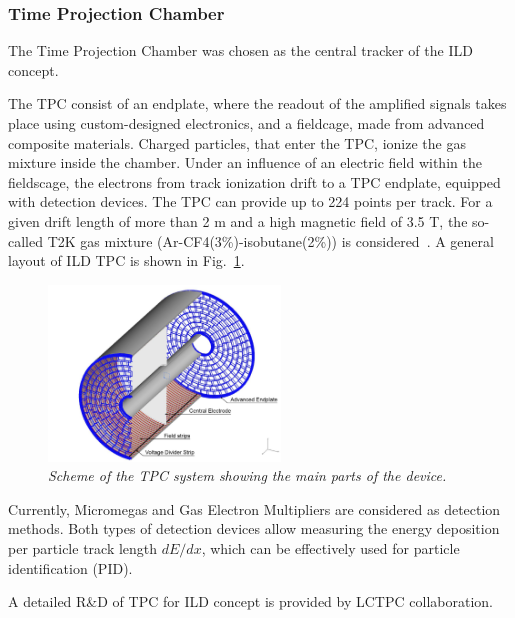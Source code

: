 \subsubsection{Time Projection Chamber}

The Time Projection Chamber was chosen as the central tracker of the ILD concept. %

The TPC consist of an endplate, where the readout of the amplified signals takes place using custom-designed electronics, and a fieldcage, made from advanced composite materials. 
Charged particles, that enter the TPC, ionize the gas mixture inside the chamber. Under an influence of an electric field within the fieldscage, the electrons from track ionization drift to a TPC endplate, equipped with detection devices. The TPC can provide up to 224 points per track.
For a given drift length of more than 2 m and a high magnetic field of 3.5 T, the so-called T2K gas mixture (Ar-CF4(3\%)-isobutane(2\%)) is considered~\cite{bib:ILC}.
A general layout of ILD TPC is shown in Fig.~\ref{fig:ILCtpc}. 
\begin{figure}
{\centering
    \includegraphics[width=0.55\textwidth]{graphics/ILCtpc.jpg}
    \caption{\sl Scheme of the TPC system showing the main parts of the device.}
    \label{fig:ILCtpc}
  }
\end{figure}	

Currently, Micromegas and Gas Electron Multipliers are considered as detection methods. Both types of detection devices allow measuring the energy deposition per particle track length $dE/dx$, which can be effectively used for particle identification (PID).

A detailed R\&D of TPC for ILD concept is provided by LCTPC collaboration.


